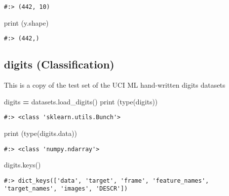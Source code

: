 \documentclass[
]{book}
\newenvironment{Shaded}{\begin{snugshade}}{\end{snugshade}}
\newcommand{\BuiltInTok}[1]{#1}
\newcommand{\NormalTok}[1]{#1}
\newcommand{\OperatorTok}[1]{\textcolor[rgb]{0.43,0.43,0.43}{\textbf{#1}}}
\begin{document}
\begin{verbatim}
#:> (442, 10)
\end{verbatim}

\begin{Shaded}
\begin{Highlighting}[]
\BuiltInTok{print}\NormalTok{ (y.shape)}
\end{Highlighting}
\end{Shaded}

\begin{verbatim}
#:> (442,)
\end{verbatim}

\hypertarget{digits-classification}{%
\subsection{digits (Classification)}\label{digits-classification}}

This is a copy of the test set of the UCI ML hand-written digits datasets

\begin{Shaded}
\begin{Highlighting}[]
\NormalTok{digits }\OperatorTok{=}\NormalTok{ datasets.load\_digits()}
\BuiltInTok{print}\NormalTok{ (}\BuiltInTok{type}\NormalTok{(digits))}
\end{Highlighting}
\end{Shaded}

\begin{verbatim}
#:> <class 'sklearn.utils.Bunch'>
\end{verbatim}

\begin{Shaded}
\begin{Highlighting}[]
\BuiltInTok{print}\NormalTok{ (}\BuiltInTok{type}\NormalTok{(digits.data))}
\end{Highlighting}
\end{Shaded}

\begin{verbatim}
#:> <class 'numpy.ndarray'>
\end{verbatim}

\begin{Shaded}
\begin{Highlighting}[]
\NormalTok{digits.keys()}
\end{Highlighting}
\end{Shaded}

\begin{verbatim}
#:> dict_keys(['data', 'target', 'frame', 'feature_names', 'target_names', 'images', 'DESCR'])
\end{verbatim}
\end{document}
